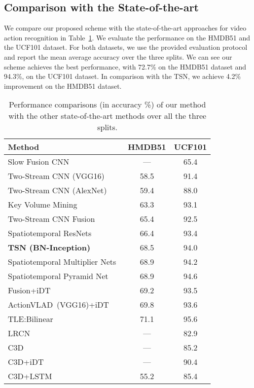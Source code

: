 \documentclass[english, 10pt, twocolumn, twoside]{IEEEtran}
\begin{document}
\subsection{Comparison with the State-of-the-art }
We compare our proposed scheme with the state-of-the-art approaches for video action recognition in Table~\ref{tab:statoftheart}. We evaluate the performance on the HMDB51 and the UCF101 dataset. For both datasets, we use the provided evaluation protocol and report the mean average accuracy over the three splits. We can see our scheme achieves the best performance, with 72.7\% on the HMDB51 dataset and 94.3\%, on the UCF101 dataset. In comparison with the TSN, we achieve 4.2\% improvement on the HMDB51 dataset.


\begin{table}[h]
\caption{Performance comparisons (in accuracy \%) of our method with the other state-of-the-art methods over all the three splits.}
\label{tab:statoftheart}
 \fontsize{9pt}{10pt}\selectfont\centering
   \begin{center}
     \begin{tabular}{|l|c|c|}
       \hline
       Method & HMDB51 & UCF101 \\
       \hline\hline
       Slow Fusion CNN~\cite{karpathy2014large} & --- & 65.4 \\				
       Two-Stream CNN (VGG16)~\cite{feichtenhofer2016convolutional} & 58.5 & 91.4 \\				
       Two-Stream CNN (AlexNet)~\cite{simonyan2014two} & 59.4 & 88.0 \\
       Key Volume Mining~\cite{zhu2016key} & 63.3 & 93.1 \\

       Two-Stream CNN Fusion~\cite{feichtenhofer2016convolutional} & 65.4 & 92.5 \\
               Spatiotemporal ResNets~\cite{feichtenhofer2016spatiotemporal} & 66.4 & 93.4 \\
       \textbf{TSN (BN-Inception)}~\cite{wang2016temporal} & 68.5 & 94.0 \\			
       Spatiotemporal Multiplier Nets~\cite{feichtenhofer2017spatiotemporal} & 68.9 & 94.2 \\
       Spatiotemporal Pyramid Net~\cite{wang2017spatiotemporal} & 68.9 & 94.6 \\
               Fusion+iDT~\cite{feichtenhofer2016convolutional} & 69.2 & 93.5 \\	
       ActionVLAD~(VGG16)+iDT~\cite{Girdhar2017ActionVLAD} & 69.8 & 93.6 \\               			
       TLE:Bilinear~\cite{diba2016deep} & 71.1 & 95.6 \\
\hline
       LRCN~\cite{donahue2015long} & --- & 82.9 \\
       C3D~\cite{tran2015learning} & --- & 85.2 \\
       C3D+iDT~\cite{tran2015learning} & --- & 90.4 \\
       C3D+LSTM~\cite{Ye2016Embedding} & 55.2 & 85.4 \\


\end{tabular}
\end{center}
\end{table}
\end{document}
